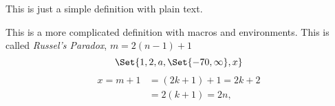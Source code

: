 \begin{SaveDefinition}[
    key=DefinitionWithText,
    title={Definition With Only Text}
]
This is just a simple definition with plain text.
\end{SaveDefinition}
\begin{SaveDefinition}[
    key=MoreComplicatedDefinition,
    title={Defintion With Macros, Environments etc.}
]
This is a more complicated definition with macros and environments.
This is called \emph{Russel's Paradox},
$m=2(n-1)+1$
\[
	\Set{1,2,a,\Set{-70,\infty}, x}
\]
\begin{align*}
    x=m+1&=(2k+1)+1=2k+2\\
    &=2(k+1)=2n,
\end{align*}
\end{SaveDefinition}